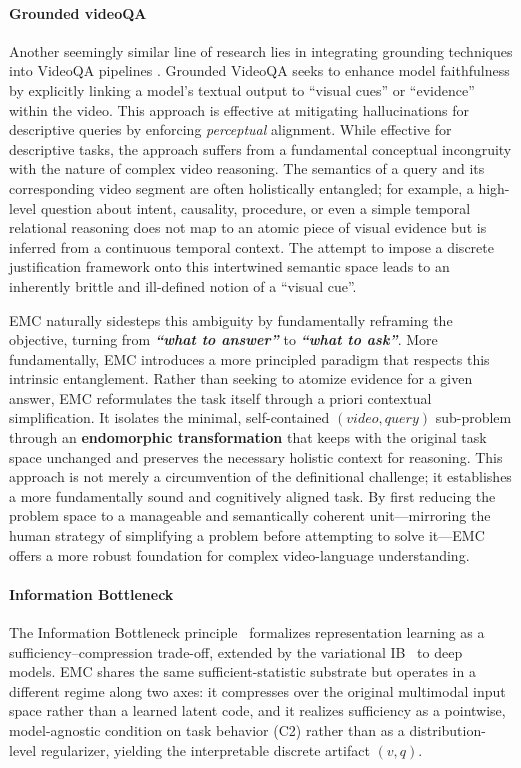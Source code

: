 \paragraph{Grounded videoQA}
Another seemingly similar line of research lies in integrating grounding techniques into VideoQA pipelines \citep{nextgqa, cgbench}. Grounded VideoQA seeks to enhance model faithfulness by explicitly linking a model's textual output to ``visual cues'' or ``evidence'' within the video. This approach is effective at mitigating hallucinations for descriptive queries by enforcing \textit{perceptual} alignment. While effective for descriptive tasks, the approach suffers from a fundamental conceptual incongruity with the nature of complex video reasoning. The semantics of a query and its corresponding video segment are often holistically entangled; for example, a high-level question about intent, causality, procedure, or even a simple temporal relational reasoning does not map to an atomic piece of visual evidence but is inferred from a continuous temporal context. The attempt to impose a discrete justification framework onto this intertwined semantic space leads to an inherently brittle and ill-defined notion of a ``visual cue''. 

EMC naturally sidesteps this ambiguity by fundamentally reframing the objective, turning from \textbf{\textit{``what to answer''}} to \textbf{\textit{``what to ask''}}. More fundamentally, EMC introduces a more principled paradigm that respects this intrinsic entanglement. Rather than seeking to atomize evidence for a given answer, EMC reformulates the task itself through a priori contextual simplification. It isolates the minimal, self-contained $(video, query)$ sub-problem through an \textbf{endomorphic transformation} that keeps with the original task space unchanged and preserves the necessary holistic context for reasoning. This approach is not merely a circumvention of the definitional challenge; it establishes a more fundamentally sound and cognitively aligned task. By first reducing the problem space to a manageable and semantically coherent unit—mirroring the human strategy of simplifying a problem before attempting to solve it—EMC offers a more robust foundation for complex video-language understanding.

\paragraph{Information Bottleneck}
The Information Bottleneck principle~\citep{tishby1999information, tishby2015deep} formalizes representation learning as a sufficiency--compression trade-off, extended by the variational IB~\citep{alemi2017deep} to deep models. EMC shares the same sufficient-statistic substrate but operates in a different regime along two axes: it compresses over the original multimodal input space rather than a learned latent code, and it realizes sufficiency as a pointwise, model-agnostic condition on task behavior (C2) rather than as a distribution-level regularizer, yielding the interpretable discrete artifact $(v, q)$.

